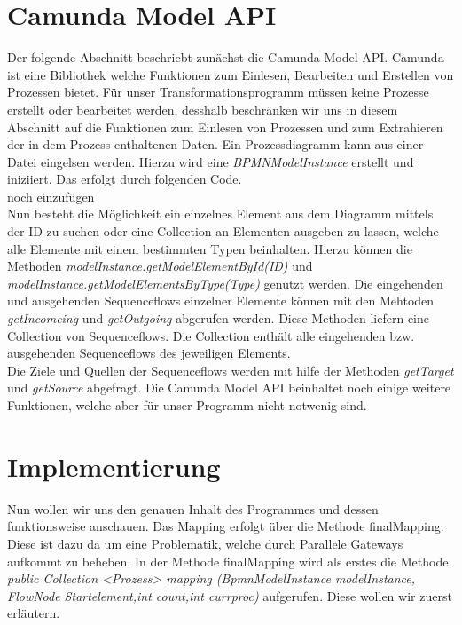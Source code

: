 \section{Camunda Model API}
Der folgende Abschnitt beschriebt zunächst die Camunda Model API. Camunda ist eine Bibliothek welche Funktionen zum Einlesen, Bearbeiten und Erstellen von Prozessen bietet. Für unser Transformationsprogramm müssen keine Prozesse erstellt oder bearbeitet werden, desshalb beschränken wir uns in diesem Abschnitt auf die Funktionen zum Einlesen von Prozessen und zum Extrahieren der in dem Prozess enthaltenen Daten. Ein Prozessdiagramm kann aus einer Datei eingelsen werden. Hierzu wird eine \textit{BPMNModelInstance} erstellt und iniziiert. Das erfolgt durch folgenden Code.\\
noch einzufügen\\
Nun besteht die Möglichkeit ein einzelnes Element aus dem Diagramm mittels der ID zu suchen oder eine Collection an Elementen ausgeben zu lassen, welche alle Elemente mit einem bestimmten Typen beinhalten. Hierzu können die Methoden \textit{modelInstance.getModelElementById(ID)} und \textit{modelInstance.getModelElementsByType(Type)} genutzt werden. Die eingehenden und ausgehenden Sequenceflows einzelner Elemente können mit den Mehtoden \textit{getIncomeing} und \textit{getOutgoing} abgerufen werden. Diese Methoden liefern eine Collection von Sequenceflows. Die Collection enthält alle eingehenden bzw. ausgehenden Sequenceflows des jeweiligen Elements.\\
Die Ziele und Quellen der Sequenceflows werden mit hilfe der Methoden \textit{getTarget} und \textit{getSource} abgefragt.
Die Camunda Model API beinhaltet noch einige weitere Funktionen, welche aber für unser Programm nicht notwenig sind.\\
\section{Implementierung}
Nun wollen wir uns den genauen Inhalt des Programmes und dessen funktionsweise anschauen. Das Mapping erfolgt über die Methode finalMapping. Diese ist dazu da um eine Problematik, welche durch Parallele Gateways aufkommt zu beheben. In der Methode finalMapping wird als erstes die Methode \textit{public Collection <Prozess> mapping (BpmnModelInstance modelInstance, FlowNode Startelement,int count,int currproc)} aufgerufen. Diese wollen wir zuerst erläutern.
